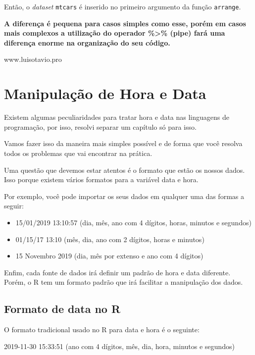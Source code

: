 \documentclass[
]{book}
\providecommand{\tightlist}{%
  \setlength{\itemsep}{0pt}\setlength{\parskip}{0pt}}
\begin{document}
Então, o \emph{dataset} \texttt{mtcars} é inserido no primeiro argumento
da função \texttt{arrange}.

\textbf{A diferença é pequena para casos simples como esse, porém em
casos mais complexos a utilização do operador \%\textgreater\% (pipe)
fará uma diferença enorme na organização do seu código.}

www.luisotavio.pro

\hypertarget{manipulauxe7uxe3o-de-hora-e-data}{%
\chapter{Manipulação de Hora e
Data}\label{manipulauxe7uxe3o-de-hora-e-data}}

Existem algumas peculiaridades para tratar hora e data nas linguagens de
programação, por isso, resolvi separar um capítulo só para isso.

Vamos fazer isso da maneira mais simples possível e de forma que você
resolva todos os problemas que vai encontrar na prática.

Uma questão que devemos estar atentos é o formato que estão os nossos
dados. Isso porque existem vários formatos para a variável data e hora.

Por exemplo, você pode importar os seus dados em qualquer uma das formas
a seguir:

\begin{itemize}
\tightlist
\item
  15/01/2019 13:10:57 (dia, mês, ano com 4 dígitos, horas, minutos e
  segundos)
\item
  01/15/17 13:10 (mês, dia, ano com 2 dígitos, horas e minutos)
\item
  15 Novembro 2019 (dia, mês por extenso e ano com 4 dígitos)
\end{itemize}

Enfim, cada fonte de dados irá definir um padrão de hora e data
diferente. Porém, o R tem um formato padrão que irá facilitar a
manipulação dos dados.

\hypertarget{formato-de-data-no-r}{%
\section{Formato de data no R}\label{formato-de-data-no-r}}

O formato tradicional usado no R para data e hora é o seguinte:

2019-11-30 15:33:51 (ano com 4 dígitos, mês, dia, hora, minutos e
segundos)
\end{document}
